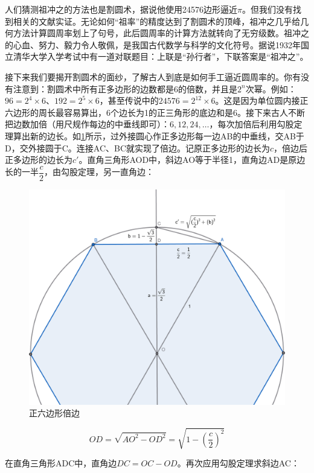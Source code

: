 \documentclass[b5paper]{ctexart}
\begin{document}
人们猜测祖冲之的方法也是割圆术，据说他使用24576边形逼近$\pi$。但我们没有找到相关的文献实证。无论如何“祖率”的精度达到了割圆术的顶峰，祖冲之几乎给几何方法计算圆周率划上了句号，此后圆周率的计算方法就转向了无穷级数。祖冲之的心血、努力、毅力令人敬佩，是我国古代数学与科学的文化符号。据说1932年国立清华大学入学考试中有一道对联题目：上联是“孙行者”，下联答案是“祖冲之”\cite{BaiHuawen}。

接下来我们要揭开割圆术的面纱，了解古人到底是如何手工逼近圆周率的。你有没有注意到：割圆术中所有正多边形的边数都是6的倍数，并且是$2^n$次幂。例如：$96 = 2^4 \times 6$、$192 = 2^5 \times 6$，甚至传说中的$24576 = 2^{12} \times 6$。这是因为单位圆内接正六边形的周长最容易算出，6个边长为1的正三角形的底边和是6。接下来古人不断把边数加倍（用尺规作每边的中垂线即可）：$6, 12, 24, \dotsc$，每次加倍后利用勾股定理算出新的边长。如\cref{fig:double-edges}所示，过外接圆心作正多边形每一边AB的中垂线，交AB于D，交外接圆于C。连接AC、BC就实现了倍边。记原正多边形的边长为$c$，倍边后正多边形的边长为$c'$。直角三角形AOD中，斜边AO等于半径1，直角边AD是原边长的一半$\dfrac{c}{2}$，由勾股定理，另一直角边：

\begin{figure}[htbp]
 \centering
 \includegraphics[scale=0.35]{img/double-edges}
 \caption{正六边形倍边}
 \label{fig:double-edges}
\end{figure}

\[
OD = \sqrt{AO^2 - OD^2} = \sqrt{1 - (\frac{c}{2})^2}
\]

在直角三角形ADC中，直角边$DC = OC - OD$。再次应用勾股定理求斜边AC：
\end{document}
